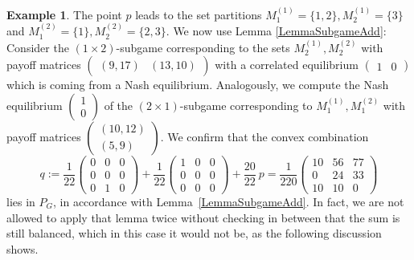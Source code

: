 \documentclass[11pt]{amsart}
\theoremstyle{definition}
\newtheorem{example}[theorem]{Example}
\numberwithin{subcase}{case}
\begin{document}
\begin{example}
The point $p$ leads to the set
partitions $M^{(1)}_1=\{1,2\}, M^{(1)}_2=\{3\}$ and $M^{(2)}_1=\{1\},
M^{(2)}_2=\{2,3\}$. We now use Lemma \ref{LemmaSubgameAdd}:   Consider the
$(1 \times 2)$-subgame corresponding to the sets $M^{(1)}_2,M^{(2)}_2$ with payoff matrices $\begin{pmatrix}
    (9,17) & (13,10)
\end{pmatrix}$ with a correlated equilibrium $\begin{pmatrix}
   1 & 0
\end{pmatrix}$ which is coming from a
Nash equilibrium. Analogously, we compute the Nash equilibrium
$\begin{pmatrix} 1 \\ 0 \end{pmatrix}$ of the
$(2 \times 1)$-subgame corresponding to $M^{(1)}_1,M^{(2)}_1$ with payoff matrices $\begin{pmatrix}
    (10,12) \\
    (5,9)
\end{pmatrix}$. We confirm that the
convex combination \[q:= \frac{1}{22} \begin{pmatrix}
    0 & 0 & 0 \\
    0 & 0 & 0 \\
    0 & 1 & 0
\end{pmatrix}+ \frac{1}{22} \begin{pmatrix}
    1 & 0 & 0 \\
    0 & 0 & 0 \\
    0 & 0 & 0
\end{pmatrix}+ \frac{20}{22} \ p = \frac{1}{220} \begin{pmatrix}
   10 & 56 & 77 \\
   0 & 24 & 33 \\
   10 & 10 & 0 
\end{pmatrix}  \] lies in $P_G$, in accordance with
Lemma~\ref{LemmaSubgameAdd}. In fact, we are not
allowed to apply that lemma twice without checking in between that the sum
is still balanced, which in this case it would not be, as the following
discussion shows.


\end{example}
\end{document}

